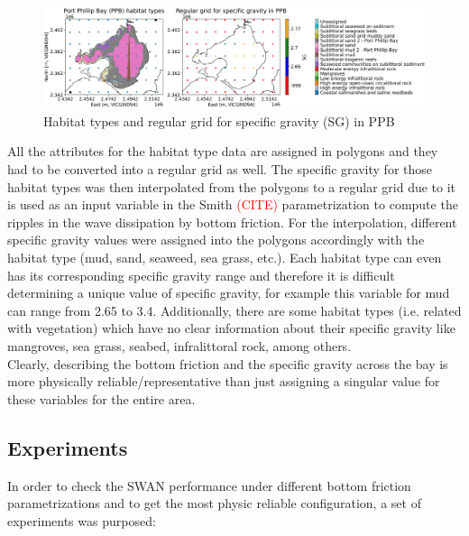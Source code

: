\documentclass[12pt]{article}
\newcommand{\tocite}{\textcolor{red}{(CITE) }}
\begin{document}
\begin{figure}[h]
    \centering
    \includegraphics[scale=0.4]{plots/maps/PPB_habitat_types_0.1_0.1.png}
    \caption{Habitat types and regular grid for specific gravity (SG) in PPB}
    \label{fig:sg_PPB}
\end{figure}

All the attributes for the habitat type data are assigned in polygons and they had to be converted into a regular grid as well. The specific gravity for those habitat types was then interpolated from the polygons to a regular grid due to it is used as an input variable in the Smith \tocite parametrization to compute the ripples in the wave dissipation by bottom friction. For the interpolation, different specific gravity values were assigned into the polygons accordingly with the habitat type (mud, sand, seaweed, sea grass, etc.). Each habitat type can even has its corresponding specific gravity range and therefore it is difficult determining a unique value of specific gravity, for example this variable for mud can range from 2.65 to 3.4. Additionally, there are some habitat types (i.e. related with vegetation) which have no clear information about their specific gravity like mangroves, sea grass, seabed, infralittoral rock, among others.\\

Clearly, describing the bottom friction and the specific gravity across the bay is more physically reliable/representative than just assigning a singular value for these variables for the entire area.

\subsection{Experiments}

In order to check the SWAN performance under different bottom friction parametrizations and to get the most physic reliable configuration, a set of experiments was purposed:
\end{document}
